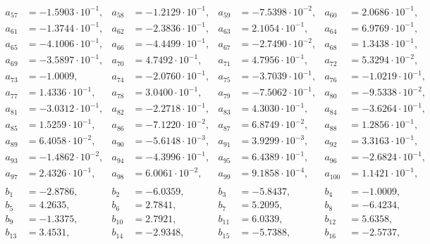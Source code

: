 \begin{align*}
a_{ 57 } &= -1.5903 \cdot 10^{ -1 }, & a_{ 58 } &= -1.2129 \cdot 10^{ -1 }, & a_{ 59 } &= -7.5398 \cdot 10^{ -2 }, & a_{ 60 } &= 2.0686 \cdot 10^{ -1 },\\ 
a_{ 61 } &= -1.3744 \cdot 10^{ -1 }, & a_{ 62 } &= -2.3836 \cdot 10^{ -1 }, & a_{ 63 } &= 2.1054 \cdot 10^{ -1 }, & a_{ 64 } &= 6.9769 \cdot 10^{ -1 },\\ 
a_{ 65 } &= -4.1006 \cdot 10^{ -1 }, & a_{ 66 } &= -4.4499 \cdot 10^{ -1 }, & a_{ 67 } &= -2.7490 \cdot 10^{ -2 }, & a_{ 68 } &= 1.3438 \cdot 10^{ -1 },\\ 
a_{ 69 } &= -3.5897 \cdot 10^{ -1 }, & a_{ 70 } &= 4.7492 \cdot 10^{ -1 }, & a_{ 71 } &= 4.7956 \cdot 10^{ -1 }, & a_{ 72 } &= 5.3294 \cdot 10^{ -2 },\\ 
a_{ 73 } &= -1.0009, & a_{ 74 } &= -2.0760 \cdot 10^{ -1 }, & a_{ 75 } &= -3.7039 \cdot 10^{ -1 }, & a_{ 76 } &= -1.0219 \cdot 10^{ -1 },\\ 
a_{ 77 } &= 1.4336 \cdot 10^{ -1 }, & a_{ 78 } &= 3.0400 \cdot 10^{ -1 }, & a_{ 79 } &= -7.5062 \cdot 10^{ -1 }, & a_{ 80 } &= -9.5338 \cdot 10^{ -2 },\\ 
a_{ 81 } &= -3.0312 \cdot 10^{ -1 }, & a_{ 82 } &= -2.2718 \cdot 10^{ -1 }, & a_{ 83 } &= 4.3030 \cdot 10^{ -1 }, & a_{ 84 } &= -3.6264 \cdot 10^{ -1 },\\ 
a_{ 85 } &= 1.5259 \cdot 10^{ -1 }, & a_{ 86 } &= -7.1220 \cdot 10^{ -2 }, & a_{ 87 } &= 6.8749 \cdot 10^{ -2 }, & a_{ 88 } &= 1.2856 \cdot 10^{ -1 },\\ 
a_{ 89 } &= 6.4058 \cdot 10^{ -2 }, & a_{ 90 } &= -5.6148 \cdot 10^{ -3 }, & a_{ 91 } &= 3.9299 \cdot 10^{ -3 }, & a_{ 92 } &= 3.3163 \cdot 10^{ -1 },\\ 
a_{ 93 } &= -1.4862 \cdot 10^{ -2 }, & a_{ 94 } &= -4.3996 \cdot 10^{ -1 }, & a_{ 95 } &= 6.4389 \cdot 10^{ -1 }, & a_{ 96 } &= -2.6824 \cdot 10^{ -1 },\\ 
a_{ 97 } &= 2.4326 \cdot 10^{ -1 }, & a_{ 98 } &= 6.0061 \cdot 10^{ -2 }, & a_{ 99 } &= 9.1858 \cdot 10^{ -4 }, & a_{ 100 } &= 1.1421 \cdot 10^{ -1 },\\ 
&&&&&&& \\ 
b_{ 1 } &= -2.8786, & b_{ 2 } &= -6.0359, & b_{ 3 } &= -5.8437, & b_{ 4 } &= -1.0009,\\ 
b_{ 5 } &= 4.2635, & b_{ 6 } &= 2.7841, & b_{ 7 } &= 5.2095, & b_{ 8 } &= -6.4234,\\ 
b_{ 9 } &= -1.3375, & b_{ 10 } &= 2.7921, & b_{ 11 } &= 6.0339, & b_{ 12 } &= 5.6358,\\ 
b_{ 13 } &= 3.4531, & b_{ 14 } &= -2.9348, & b_{ 15 } &= -5.7388, & b_{ 16 } &= -2.5737,\\ 

\end{align*}
